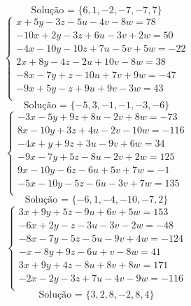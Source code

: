 \documentclass[12pt,oneside,a4paper]{article}
\begin{document}
\begin{equation*}
\text{Solução = }\{6,1,-2,-7,-7,7\}
\end{equation*}
\vspace{\baselineskip}
\begin{equation*}
\begin{cases}
x+5y-3z-5u-4v-8w=78 \\
-10x+2y-3z+6u-3v+2w=50 \\
-4x-10y-10z+7u-5v+5w=-22 \\
2x+8y-4z-2u+10v-8w=38 \\
-8x-7y+z-10u+7v+9w=-47 \\
-9x+5y-z+9u+9v-3w=43 \\
\end{cases}
\end{equation*}
\begin{equation*}
\text{Solução = }\{-5,3,-1,-1,-3,-6\}
\end{equation*}
\vspace{\baselineskip}
\begin{equation*}
\begin{cases}
-3x-5y+9z+8u-2v+8w=-73 \\
8x-10y+3z+4u-2v-10w=-116 \\
-4x+y+9z+3u-9v+6w=34 \\
-9x-7y+5z-8u-2v+2w=125 \\
9x-10y-6z-6u+5v+7w=-1 \\
-5x-10y-5z-6u-3v+7w=135 \\
\end{cases}
\end{equation*}
\begin{equation*}
\text{Solução = }\{-6,1,-4,-10,-7,2\}
\end{equation*}
\vspace{\baselineskip}
\begin{equation*}
\begin{cases}
3x+9y+5z-9u+6v+5w=153 \\
-6x+2y-z-3u-3v-2w=-48 \\
-8x-7y-5z-5u-9v+4w=-124 \\
-x-8y+9z-6u+v-8w=41 \\
3x+9y+4z-8u+8v+8w=171 \\
-2x-2y-3z+7u-4v-9w=-116 \\
\end{cases}
\end{equation*}
\begin{equation*}
\text{Solução = }\{3,2,8,-2,8,4\}
\end{equation*}
\end{document}
